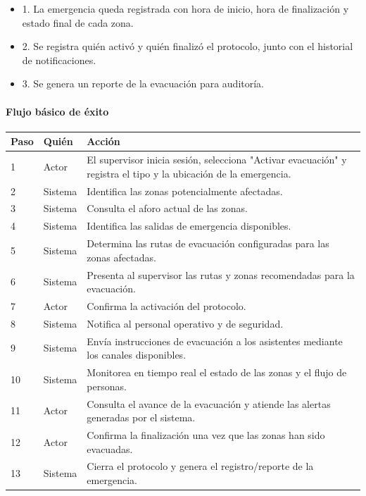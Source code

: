 \begin{description}[leftmargin=!, labelwidth=3.4cm, style=nextline, topsep=3pt]
\item[Post-condiciones] \hfill
\begin{itemize}[leftmargin=1.2em, topsep=1pt]
  \item 1. La emergencia queda registrada con hora de inicio, hora de finalización y estado final de cada zona.
  \item 2. Se registra quién activó y quién finalizó el protocolo, junto con el historial de notificaciones.
  \item 3. Se genera un reporte de la evacuación para auditoría.
\end{itemize}

\end{description}

\paragraph{Flujo básico de éxito}
\begin{longtable}{P{1.1cm}P{1.8cm}P{10.5cm}}
\toprule
\textbf{Paso} & \textbf{Quién} & \textbf{Acción}\\
\midrule
{} & Actor & El supervisor inicia sesión, selecciona "Activar evacuación" y registra el tipo y la ubicación de la emergencia.\\
2 & Sistema & Identifica las zonas potencialmente afectadas.\\
3 & Sistema & Consulta el aforo actual de las zonas.\\
4 & Sistema & Identifica las salidas de emergencia disponibles.\\
5 & Sistema & Determina las rutas de evacuación configuradas para las zonas afectadas.\\
6 & Sistema & Presenta al supervisor las rutas y zonas recomendadas para la evacuación.\\
7 & Actor & Confirma la activación del protocolo.\\
8 & Sistema & Notifica al personal operativo y de seguridad.\\
9 & Sistema & Envía instrucciones de evacuación a los asistentes mediante los canales disponibles.\\
10 & Sistema & Monitorea en tiempo real el estado de las zonas y el flujo de personas.\\
11 & Actor & Consulta el avance de la evacuación y atiende las alertas generadas por el sistema.\\
12 & Actor & Confirma la finalización una vez que las zonas han sido evacuadas.\\
13 & Sistema & Cierra el protocolo y genera el registro/reporte de la emergencia.\\
\bottomrule
\end{longtable}

